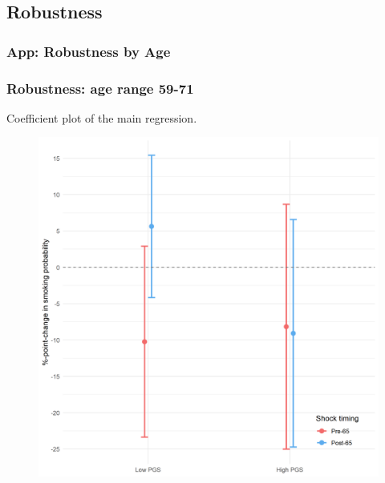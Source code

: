 \documentclass[10pt,compress,xcolor=dvipsnames,aspectratio=169]{beamer}    %
\newcounter{ex}
\newcommand{\1}[1]{\mathrm{1\hspace*{-2.5pt}l}[#1]}	%
\begin{document}
\subsection{Robustness}
%
%

\subsubsection{App: Robustness by Age}
\begin{frame}
\frametitle{Robustness: age range 59-71}
Coefficient plot of the main regression.
\begin{figure}[hbtp]
\centering
\includegraphics[height=0.8\textheight]{../../3_output/shock_effects/robustness_5971_100_cvplot.png}
\label{fig:coeffplot59-71}
\end{figure}
\hyperlink{frame:robustness}{}
\end{frame}
\end{document}
